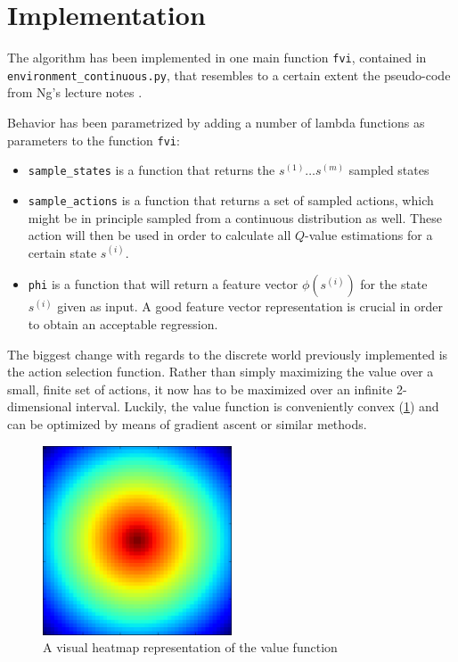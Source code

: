 \documentclass[a4paper, 12pt]{article}
\begin{document}
\section*{Implementation} 
The algorithm has been implemented in one main function \texttt{fvi}, contained in \texttt{environment\_continuous.py}, 
that resembles to a certain extent the pseudo-code
from Ng's lecture notes \cite{ng_lecture}.

Behavior has been parametrized by adding a number of lambda functions
as parameters to the function \texttt{fvi}:

\begin{itemize}
\item \texttt{sample\_states} is a function that returns the $s^{(1)}\ldots s^{(m)}$ sampled states
\item \texttt{sample\_actions} is a function that returns a set of sampled actions, which might be in principle sampled from a continuous distribution as well.
These action will then be used in order to calculate all $Q$-value
estimations for a certain state $s^{(i)}$.
\item \texttt{phi} is a function that will return a feature vector
$\phi(s^{(i)})$ for the state $s^{(i)}$ given as input.
A good feature vector representation is
crucial in order to obtain an acceptable regression.
\end{itemize}

The biggest change with regards to the discrete world previously implemented is
the action selection function. Rather than simply maximizing the value over a
small, finite set of actions, it now has to be maximized over an infinite
2-dimensional interval. Luckily, the value function is conveniently convex
(\ref{fig:V}) and can be optimized by means of gradient ascent or similar
methods.

\begin{figure}[h!]
  \centering
  \includegraphics[width=0.5\textwidth]{V.png}
  \caption{A visual heatmap representation of the value function}
  \label{fig:V}
\end{figure}
\end{document}
